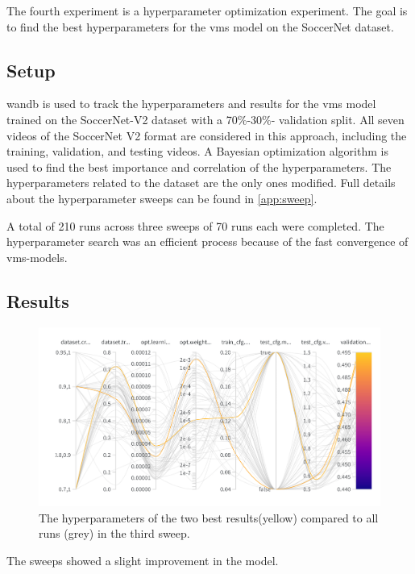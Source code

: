 The fourth experiment is a hyperparameter optimization experiment.
The goal is to find the best hyperparameters for the \acrshort{vms} model on the SoccerNet dataset.

\subsection{Setup}
\label{ssec:ex4_setup}

\acrlong{wandb} is used to track the hyperparameters and results for the \acrshort{vms} model trained on the SoccerNet-V2 dataset with a 70\(\%\)-30\(\%\)- validation split. All seven videos of the SoccerNet V2 format are considered in this approach, including the training, validation, and testing videos. A Bayesian optimization algorithm is used to find the best importance and correlation of the hyperparameters. The hyperparameters related to the dataset are the only ones modified. Full details about the hyperparameter sweeps can be found in \autoref{app:sweep}.

A total of 210 runs across three sweeps of 70 runs each were completed. The hyperparameter search was an efficient process because of the fast convergence of \acrshort{vms}-models. 


\subsection{Results}
\label{ssec:ex4_results}

\begin{figure}[ht]
    \centering
    \includegraphics[width=1\linewidth]{figures/sweep_two_best.png}
    \caption{The hyperparameters of the two best results(yellow) compared to all runs (grey) in the third sweep. }
    \label{fig:sweep_best_two}
\end{figure}

The sweeps showed a slight improvement in the model. 

